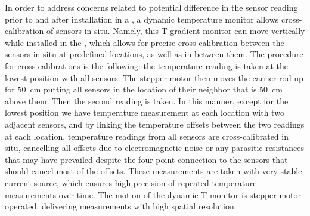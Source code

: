  
 In order to address concerns related to potential difference in the sensor reading prior to %
 and after installation in a , a dynamic temperature monitor allows cross-calibration of sensors in situ. 
 Namely, this T-gradient monitor  can move vertically while installed in the , which allows for precise cross-calibration between the sensors in situ at predefined locations, as well as in between them. 
 The procedure for cross-calibrations is the following: the temperature reading is taken at the lowest position with all sensors. The stepper motor then moves the carrier rod up for \SI{50}{cm} 
  putting all sensors in the location of their neighbor that is \SI{50}{cm} above them. 
 Then the second reading is taken. In this manner, except for the lowest position we have temperature measurement at each location with two adjacent sensors, and by linking the temperature offsets between the two readings at each location, temperature readings from all sensors are cross-calibrated in situ, cancelling all offsets due to electromagnetic noise or any parasitic resistances that may have prevailed despite the four point connection to the sensors that should cancel most of the offsets. These measurements are taken with very stable current source, which ensures high precision of repeated temperature measurements over time. The motion of the dynamic T-monitor is stepper motor operated, 
delivering measurements with high spatial resolution. 


